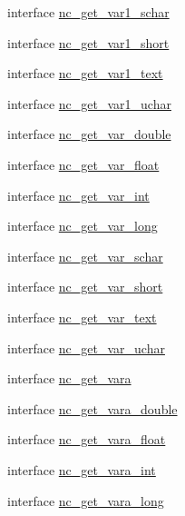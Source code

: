 \begin{DoxyCompactItemize}
interface \hyperlink{interfacenetcdf__nc__interfaces_1_1nc__get__var1__schar}{nc\+\_\+get\+\_\+var1\+\_\+schar}
\item 
interface \hyperlink{interfacenetcdf__nc__interfaces_1_1nc__get__var1__short}{nc\+\_\+get\+\_\+var1\+\_\+short}
\item 
interface \hyperlink{interfacenetcdf__nc__interfaces_1_1nc__get__var1__text}{nc\+\_\+get\+\_\+var1\+\_\+text}
\item 
interface \hyperlink{interfacenetcdf__nc__interfaces_1_1nc__get__var1__uchar}{nc\+\_\+get\+\_\+var1\+\_\+uchar}
\item 
interface \hyperlink{interfacenetcdf__nc__interfaces_1_1nc__get__var__double}{nc\+\_\+get\+\_\+var\+\_\+double}
\item 
interface \hyperlink{interfacenetcdf__nc__interfaces_1_1nc__get__var__float}{nc\+\_\+get\+\_\+var\+\_\+float}
\item 
interface \hyperlink{interfacenetcdf__nc__interfaces_1_1nc__get__var__int}{nc\+\_\+get\+\_\+var\+\_\+int}
\item 
interface \hyperlink{interfacenetcdf__nc__interfaces_1_1nc__get__var__long}{nc\+\_\+get\+\_\+var\+\_\+long}
\item 
interface \hyperlink{interfacenetcdf__nc__interfaces_1_1nc__get__var__schar}{nc\+\_\+get\+\_\+var\+\_\+schar}
\item 
interface \hyperlink{interfacenetcdf__nc__interfaces_1_1nc__get__var__short}{nc\+\_\+get\+\_\+var\+\_\+short}
\item 
interface \hyperlink{interfacenetcdf__nc__interfaces_1_1nc__get__var__text}{nc\+\_\+get\+\_\+var\+\_\+text}
\item 
interface \hyperlink{interfacenetcdf__nc__interfaces_1_1nc__get__var__uchar}{nc\+\_\+get\+\_\+var\+\_\+uchar}
\item 
interface \hyperlink{interfacenetcdf__nc__interfaces_1_1nc__get__vara}{nc\+\_\+get\+\_\+vara}
\item 
interface \hyperlink{interfacenetcdf__nc__interfaces_1_1nc__get__vara__double}{nc\+\_\+get\+\_\+vara\+\_\+double}
\item 
interface \hyperlink{interfacenetcdf__nc__interfaces_1_1nc__get__vara__float}{nc\+\_\+get\+\_\+vara\+\_\+float}
\item 
interface \hyperlink{interfacenetcdf__nc__interfaces_1_1nc__get__vara__int}{nc\+\_\+get\+\_\+vara\+\_\+int}
\item 
interface \hyperlink{interfacenetcdf__nc__interfaces_1_1nc__get__vara__long}{nc\+\_\+get\+\_\+vara\+\_\+long}

\end{DoxyCompactItemize}
